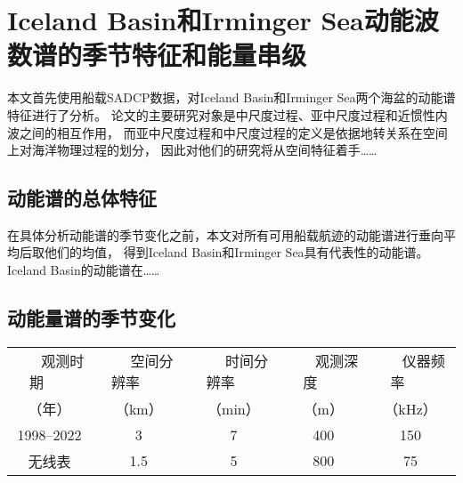 \chapter{Iceland Basin和Irminger Sea动能波数谱的季节特征和能量串级}

本文首先使用船载SADCP数据，对Iceland Basin和Irminger Sea两个海盆的动能谱特征进行了分析。
论文的主要研究对象是中尺度过程、亚中尺度过程和近惯性内波之间的相互作用，
而亚中尺度过程和中尺度过程的定义是依据地转关系在空间上对海洋物理过程的划分，
因此对他们的研究将从空间特征着手……

\section{动能谱的总体特征}

在具体分析动能谱的季节变化之前，本文对所有可用船载航迹的动能谱进行垂向平均后取他们的均值，
得到Iceland Basin和Irminger Sea具有代表性的动能谱。
Iceland Basin的动能谱在……

\section{动能量谱的季节变化}

\begin{table}[htb]
  \centering\small
  \label{tab:exampletable}
  \begin{tabular}{ccccc}
    \toprule[1.5pt]
    ~~~ 观测时期 ~~~   & ~~~ 空间分辨率 ~~~  & ~~~ 时间分辨率 ~~~  
      & ~~~ 观测深度 ~~~ & ~~~ 仪器频率 ~~~  \\
    （年） & （km） & （min） & （m） & （kHz）  \\
    \midrule[0.5pt]
    1998--2022 & 3 & 7 & 400 & 150 \\
    无线表 & 1.5 & 5 & 800 & 75   \\
    \bottomrule[1.5pt]
  \end{tabular}
\end{table}

